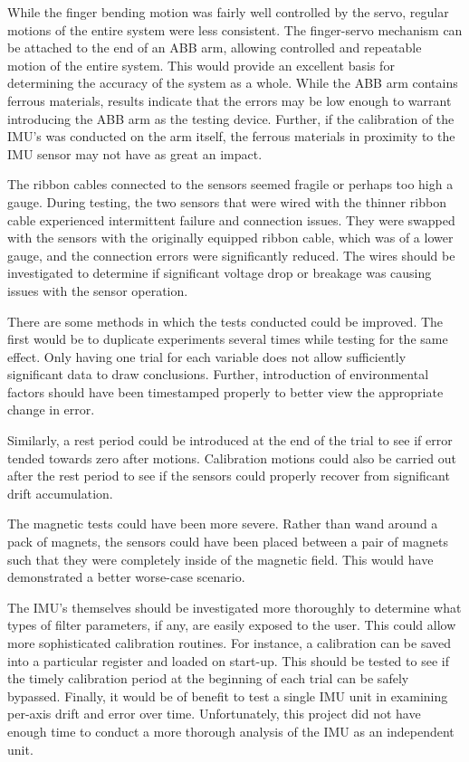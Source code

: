 \documentclass[letterpaper, 10 pt, conference]{ieeeconf}  %
\begin{document}
While the finger bending motion was fairly well controlled by the servo, regular motions of the entire system were less consistent. The finger-servo mechanism can be attached to the end of an ABB arm, allowing controlled and repeatable motion of the entire system. This would provide an excellent basis for determining the accuracy of the system as a whole. While the ABB arm contains ferrous materials, results indicate that the errors may be low enough to warrant introducing the ABB arm as the testing device. Further, if the calibration of the IMU's was conducted on the arm itself, the ferrous materials in proximity to the IMU sensor may not have as great an impact.

The ribbon cables connected to the sensors seemed fragile or perhaps too high a gauge. During testing, the two sensors that were wired with the thinner ribbon cable experienced intermittent failure and connection issues. They were swapped with the sensors with the originally equipped ribbon cable, which was of a lower gauge, and the connection errors were significantly reduced. The wires should be investigated to determine if significant voltage drop or breakage was causing issues with the sensor operation.

There are some methods in which the tests conducted could be improved. The first would be to duplicate experiments several times while testing for the same effect. Only having one trial for each variable does not allow sufficiently significant data to draw conclusions. Further, introduction of environmental factors should have been timestamped properly to better view the appropriate change in error. 

Similarly, a rest period could be introduced at the end of the trial to see if error tended towards zero after motions. Calibration motions could also be carried out after the rest period to see if the sensors could properly recover from significant drift accumulation. 

The magnetic tests could have been more severe. Rather than wand around a pack of magnets, the sensors could have been placed between a pair of magnets such that they were completely inside of the magnetic field. This would have demonstrated a better worse-case scenario.

The IMU's themselves should be investigated more thoroughly to determine what types of filter parameters, if any, are easily exposed to the user. This could allow more sophisticated calibration routines. For instance, a calibration can be saved into a particular register and loaded on start-up. This should be tested to see if the timely calibration period at the beginning of each trial can be safely bypassed. Finally, it would be of benefit to test a single IMU unit in examining per-axis drift and error over time. Unfortunately, this project did not have enough time to conduct a more thorough analysis of the IMU as an independent unit.
\end{document}
